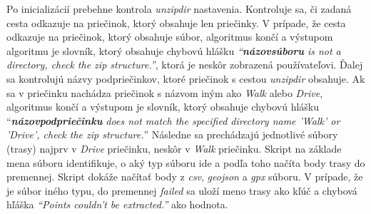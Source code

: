 Po inicializácií prebehne kontrola \textit{unzipdir} nastavenia. Kontroluje sa, či zadaná cesta odkazuje na priečinok, ktorý obsahuje len priečinky. V prípade, že cesta odkazuje na priečinok, ktorý obsahuje súbor, algoritmus končí a výstupom algoritmu je slovník, ktorý obsahuje chybovú hlášku \textit{``\textbf{názov\textunderscore súboru} is not a directory, check the zip structure.''}, ktorá je neskôr zobrazená používateľovi. Ďalej sa kontrolujú názvy podpriečinkov, ktoré priečinok s cestou \textit{unzipdir} obsahuje. Ak sa v priečinku nachádza priečinok s názvom iným ako \textit{Walk} alebo \textit{Drive}, algoritmus končí a výstupom je slovník, ktorý obsahuje chybovú hlášku ``\textit{\textbf{názov\textunderscore podpriečinku} does not match the specified directory name 'Walk' or 'Drive', check the zip structure.}'' Následne sa prechádzajú jednotlivé súbory (trasy) najprv v \textit{Drive} priečinku, neskôr v \textit{Walk} priečinku. Skript na základe mena súboru identifikuje, o aký typ súboru ide a podľa toho načíta body trasy do premennej. Skript dokáže načítať body z \textit{csv}, \textit{geojson} a \textit{gpx} súboru. V prípade, že je súbor iného typu, do premennej \textit{failed} sa uloží meno trasy ako kľúč a chybová hľáška \textit{``Points couldn't be extracted.''}  ako hodnota.

